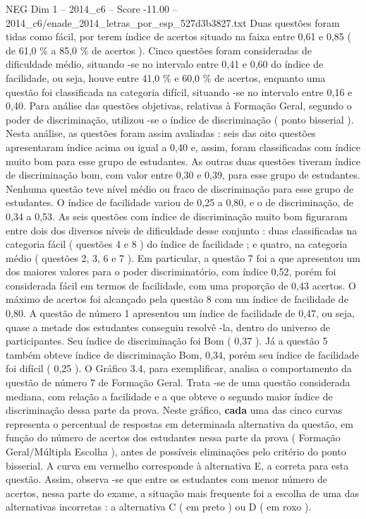 \begin{textsample}{NEG Dim 1 – 2014\_c6 – Score -11.00 – 2014\_c6/enade\_2014\_letras\_por\_esp\_527d3b3827.txt}
Duas questões foram tidas como fácil, por terem índice de acertos situado na faixa entre 0,61 e 0,85 ( de 61,0 \% a 85,0 \% de acertos ).
Cinco questões foram consideradas de dificuldade médio, situando -se no intervalo entre 0,41 e 0,60 do índice de facilidade, ou seja, houve entre 41,0 \% e 60,0 \% de acertos, enquanto uma questão foi classificada na categoria difícil, situando -se no intervalo entre 0,16 e 0,40.
Para análise das questões objetivas, relativas à Formação Geral, segundo o poder de discriminação, utilizou -se o índice de discriminação ( ponto bisserial ).
Nesta análise, as questões foram assim avaliadas : seis das oito questões apresentaram índice acima ou igual a 0,40 e, assim, foram classificadas com índice muito bom para esse grupo de estudantes.
As outras duas questões tiveram índice de discriminação bom, com valor entre 0,30 e 0,39, para esse grupo de estudantes.
Nenhuma questão teve nível médio ou fraco de discriminação para esse grupo de estudantes.
O índice de facilidade variou de 0,25 a 0,80, e o de discriminação, de 0,34 a 0,53.
As seis questões com índice de discriminação muito bom figuraram entre dois dos diversos níveis de dificuldade desse conjunto : duas classificadas na categoria fácil ( questões 4 e 8 ) do índice de facilidade ; e quatro, na categoria médio ( questões 2, 3, 6 e 7 ).
Em particular, a questão 7 foi a que apresentou um dos maiores valores para o poder discriminatório, com índice 0,52, porém foi considerada fácil em termos de facilidade, com uma proporção de 0,43 acertos.
O máximo de acertos foi alcançado pela questão 8 com um índice de facilidade de 0,80.
A questão de número 1 apresentou um índice de facilidade de 0,47, ou seja, quase a metade dos estudantes conseguiu resolvê -la, dentro do universo de participantes.
Seu índice de discriminação foi Bom ( 0,37 ).
Já a questão 5 também obteve índice de discriminação Bom, 0,34, porém seu índice de facilidade foi difícil ( 0,25 ).
O Gráfico 3.4, para exemplificar, analisa o comportamento da questão de número 7 de Formação Geral.
Trata -se de uma questão considerada mediana, com relação a facilidade e a que obteve o segundo maior índice de discriminação dessa parte da prova.
Neste gráfico, \textbf{cada} uma das cinco curvas representa o percentual de respostas em determinada alternativa da questão, em função do número de acertos dos estudantes nessa parte da prova ( Formação Geral/Múltipla Escolha ), antes de possíveis eliminações pelo critério do ponto bisserial.
A curva em vermelho corresponde à alternativa E, a correta para esta questão.
Assim, observa -se que entre os estudantes com menor número de acertos, nessa parte do exame, a situação mais frequente foi a escolha de uma das alternativas incorretas : a alternativa C ( em preto ) ou D ( em roxo ).

\end{textsample}

